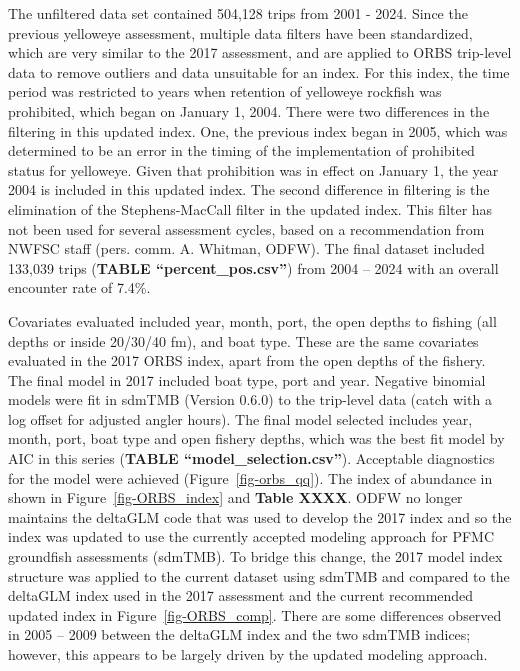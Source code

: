 \documentclass[
]{scrartcl}
\begin{document}
The unfiltered data set contained 504,128 trips from 2001 - 2024. Since
the previous yelloweye assessment, multiple data filters have been
standardized, which are very similar to the 2017 assessment, and are
applied to ORBS trip-level data to remove outliers and data unsuitable
for an index. For this index, the time period was restricted to years
when retention of yelloweye rockfish was prohibited, which began on
January 1, 2004. There were two differences in the filtering in this
updated index. One, the previous index began in 2005, which was
determined to be an error in the timing of the implementation of
prohibited status for yelloweye. Given that prohibition was in effect on
January 1, the year 2004 is included in this updated index. The second
difference in filtering is the elimination of the Stephens-MacCall
filter in the updated index. This filter has not been used for several
assessment cycles, based on a recommendation from NWFSC staff (pers.
comm. A. Whitman, ODFW). The final dataset included 133,039 trips
(\textbf{TABLE ``percent\_pos.csv''}) from 2004 -- 2024 with an overall
encounter rate of 7.4\%.

Covariates evaluated included year, month, port, the open depths to
fishing (all depths or inside 20/30/40 fm), and boat type. These are the
same covariates evaluated in the 2017 ORBS index, apart from the open
depths of the fishery. The final model in 2017 included boat type, port
and year. Negative binomial models were fit in sdmTMB (Version 0.6.0) to
the trip-level data (catch with a log offset for adjusted angler hours).
The final model selected includes year, month, port, boat type and open
fishery depths, which was the best fit model by AIC in this series
(\textbf{TABLE ``model\_selection.csv''}). Acceptable diagnostics for
the model were achieved (Figure~\ref{fig-orbs_qq}). The index of
abundance in shown in Figure~\ref{fig-ORBS_index} and \textbf{Table
XXXX}. ODFW no longer maintains the deltaGLM code that was used to
develop the 2017 index and so the index was updated to use the currently
accepted modeling approach for PFMC groundfish assessments (sdmTMB). To
bridge this change, the 2017 model index structure was applied to the
current dataset using sdmTMB and compared to the deltaGLM index used in
the 2017 assessment and the current recommended updated index in
Figure~\ref{fig-ORBS_comp}. There are some differences observed in 2005
-- 2009 between the deltaGLM index and the two sdmTMB indices; however,
this appears to be largely driven by the updated modeling approach.
\end{document}
